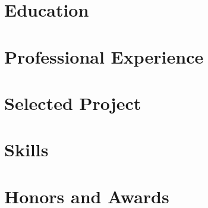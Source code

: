 \documentclass[letterpaper,10pt]{article}
\begin{document}
\thispagestyle{empty}
\resumeheader
\section{Education}


%

\section{Professional Experience}




\section{Selected Project}


\section{Skills}


\section{Honors and Awards}

\end{document}
